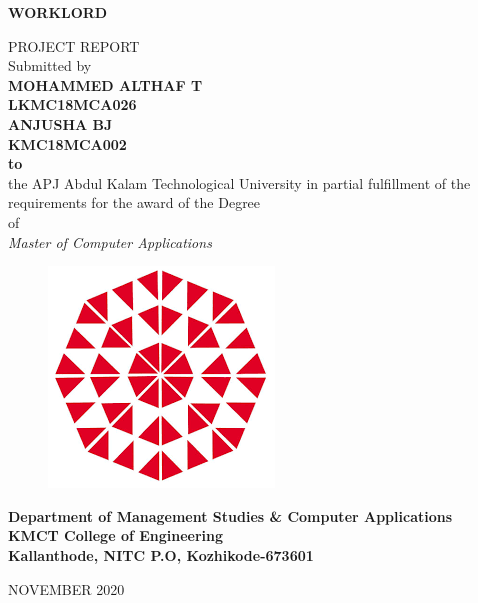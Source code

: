 \documentclass[a4paper,12pt]{report}
\begin{document}
{\centering \bf \large
	WORKLORD\par
}
\begin{center}
	{\small PROJECT REPORT} \vspace*{10pt}
	\\ Submitted by\\
	\vspace*{15pt}
	{\bf MOHAMMED ALTHAF T\\
\vspace*{8pt}	LKMC18MCA026\\

\vspace*{8pt}ANJUSHA BJ\\
\vspace*{8pt}KMC18MCA002\\
	\vspace*{20pt}
	to}\\
	\vspace*{13pt}
	the APJ Abdul Kalam Technological University in partial fulfillment of
	the requirements for the award of the Degree\\
	\vspace*{10pt} of\\
	\vspace*{10pt} \textit{ Master of Computer Applications
	} 
\vspace*{10pt}
\begin{figure}[bph]
	\centering
	\includegraphics[width=0.3023\linewidth]{kmct}
	\label{fig:ksblogo}
\end{figure}

	\bf{Department of Management Studies \&  Computer Applications
	\vspace*{15pt}
	\\KMCT College of Engineering
	\vspace*{10pt}
	\\Kallanthode, NITC P.O, Kozhikode-673601}

\end{center}
	\begin{center}
		\vspace*{15pt}NOVEMBER 2020
	\end{center}
\end{document}
